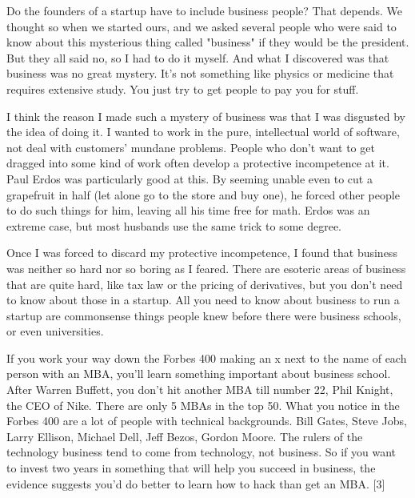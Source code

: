 Do
                    the founders of a startup have to include business people?
                    That depends. We thought so when we started ours, and we
                    asked several people who were said to know about this
                    mysterious thing called "business" if they would be the
                    president. But they all said no, so I had to do it myself.
                    And what I discovered was that business was no great
                    mystery. It's not something like physics or medicine that
                    requires extensive study. You just try to get people to pay
                    you for stuff.

I think the reason I made such a
                    mystery of business was that I was disgusted by the idea of
                    doing it. I wanted to work in the pure, intellectual world
                    of software, not deal with customers' mundane problems.
                    People who don't want to get dragged into some kind of work
                    often develop a protective incompetence at it. Paul Erdos
                    was particularly good at this. By seeming unable even to cut
                    a grapefruit in half (let alone go to the store and buy
                    one), he forced other people to do such things for him,
                    leaving all his time free for math. Erdos was an extreme
                    case, but most husbands use the same trick to some
                    degree.

Once I was forced to discard my
                    protective incompetence, I found that business was neither
                    so hard nor so boring as I feared. There are esoteric areas
                    of business that are quite hard, like tax law or the pricing
                    of derivatives, but you don't need to know about those in a
                    startup. All you need to know about business to run a
                    startup are commonsense things people knew before there were
                    business schools, or even universities.

If you
                    work your way down the Forbes 400 making an x next to the
                    name of each person with an MBA, you'll learn something
                    important about business school. After Warren Buffett, you
                    don't hit another MBA till number 22, Phil Knight, the CEO
                    of Nike. There are only 5 MBAs in the top 50. What you
                    notice in the Forbes 400 are a lot of people with technical
                    backgrounds. Bill Gates, Steve Jobs, Larry Ellison, Michael
                    Dell, Jeff Bezos, Gordon Moore. The rulers of the technology
                    business tend to come from technology, not business. So if
                    you want to invest two years in something that will help you
                    succeed in business, the evidence suggests you'd do better
                    to learn how to hack than get an MBA. [3]

